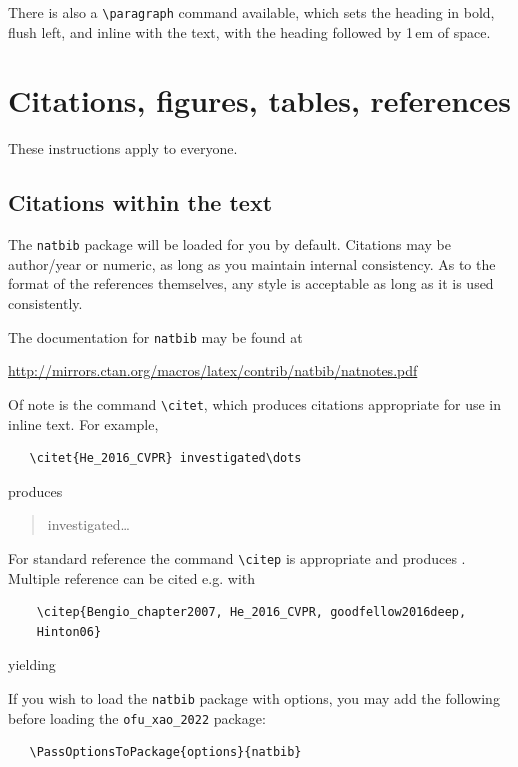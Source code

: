 \documentclass[a4paper]{article}
\begin{document}
There is also a \verb+\paragraph+ command available, which sets the heading in
bold, flush left, and inline with the text, with the heading followed by 1\,em
of space.


\section{Citations, figures, tables, references}
\label{others}


These instructions apply to everyone.


\subsection{Citations within the text}


The \verb+natbib+ package will be loaded for you by default.  Citations may be
author/year or numeric, as long as you maintain internal consistency.  As to the
format of the references themselves, any style is acceptable as long as it is
used consistently.


The documentation for \verb+natbib+ may be found at
\begin{center}
  \url{http://mirrors.ctan.org/macros/latex/contrib/natbib/natnotes.pdf}
\end{center}
Of note is the command \verb+\citet+, which produces citations appropriate for
use in inline text.  For example,
\begin{verbatim}
   \citet{He_2016_CVPR} investigated\dots
\end{verbatim}
produces
\begin{quote}
  \citet{He_2016_CVPR} investigated\dots
\end{quote}

For standard reference the command \verb+\citep+ is appropriate and produces \citep{He_2016_CVPR}. Multiple reference can be cited e.g. with
\begin{verbatim}
    \citep{Bengio_chapter2007, He_2016_CVPR, goodfellow2016deep, 
    Hinton06}
\end{verbatim}
yielding 
\begin{quote}
    \citep{Bengio_chapter2007, He_2016_CVPR, goodfellow2016deep, Hinton06}
\end{quote}

If you wish to load the \verb+natbib+ package with options, you may add the
following before loading the \verb+ofu_xao_2022+ package:
\begin{verbatim}
   \PassOptionsToPackage{options}{natbib}
\end{verbatim}
\end{document}
